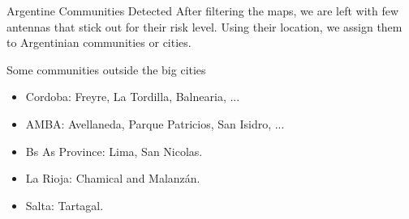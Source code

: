 \documentclass{beamer}
\begin{document}
\begin{frame}{Argentine Communities Detected}
	After filtering the maps, we are left with few antennas that stick out for their risk level. Using their location, we assign them to Argentinian communities or cities.


	\bigskip

	\begin{block}{Some communities outside the big cities}
		\begin{itemize}
			\item Cordoba: Freyre, La Tordilla, Balnearia, ... %
			\item AMBA: Avellaneda, Parque Patricios, San Isidro, ... %
			\item Bs As Province: Lima, San Nicolas.
			\item La Rioja: Chamical and Malanz\'an.
			\item Salta: Tartagal.
		\end{itemize}

	\end{block}
\end{frame}



\end{document}
